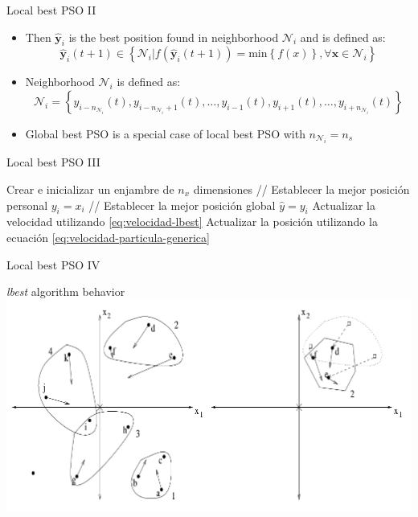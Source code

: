 \documentclass[aspectratio=169,compress,10pt]{beamer}
\begin{document}
\begin{frame}{Local best PSO II}
\begin{itemize}
	\item Then $\mathbf{\hat{y}}_i$ is the best position found in neighborhood $\mathcal{N}_i$ and is defined as:
$$
\mathbf{\hat{y}}_i (t+1) \in \left \{ \mathcal{N}_i | f( \mathbf{\hat{y}}_i (t+1) ) = \text{min} \left \{ f(x) \right \}, \forall \mathbf{x} \in \mathcal{N}_i \right \}
$$
\item Neighborhood $\mathcal{N}_i$ is defined as:
$$
\mathcal{N}_i = \left \{ y_{{i-n}_{\mathcal{N}_i}}(t), y_{i-n_{\mathcal{N}_i}+1 }(t), \ldots, y_{i-1}(t), y_{i+1}(t), \ldots, y_{i+n_{\mathcal{N}_i} }(t) \right \}
$$
\item Global best PSO is a special case of local best PSO with $n_{\mathcal{N}_i} = n_s$
\end{itemize}
\end{frame}

\begin{frame}{Local best PSO III}
\begin{algorithm}[H]
\scriptsize
\begin{algorithmic}[1] 
\STATE Crear e inicializar un enjambre de $n_x$ dimensiones
\REPEAT
		\STATE // Establecer la mejor posición personal
			\STATE $y_i = x_i$
		\ENDIF
		\STATE // Establecer la mejor posición global 
			\STATE $\hat{y} = y_i$
		\ENDIF
	\ENDFOR
		\STATE Actualizar la velocidad utilizando \ref{eq:velocidad-lbest}
		\STATE Actualizar la posición utilizando la ecuación \ref{eq:velocidad-particula-generica}
	\ENDFOR
{}
\end{algorithmic} 
\caption{Algoritmo PSO lbest} 
\label{alg:algoritmo-pso-lbest}
\end{algorithm}
\end{frame}

\begin{frame}{Local best PSO IV}
\begin{block}{\emph{lbest} algorithm behavior}
\centering
\includegraphics[scale=0.25]{../resources/lbest-behavior}
\end{block}
\end{frame}
\end{document}
